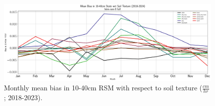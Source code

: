 \begin{figure}[h!]
    \centering

    \includegraphics[width=.99\linewidth,draft=false]{figures/grid-eval_qtrly/eval-grid_full_lstm-rsm-9_pixelwise-time-stats_monthly-txtr-bias-state-rsm-40.png}

    \caption{Monthly mean bias in 10-40cm RSM with respect to soil texture ($\frac{cm}{hr}$; 2018-2023).}
    \label{bulk-eval_monthly_txtr-bias}
\end{figure}

